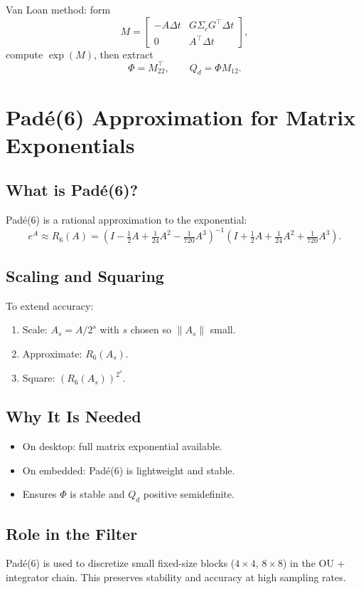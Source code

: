 \documentclass[11pt]{article}
\begin{document}
Van Loan method: form
\[
M = \begin{bmatrix}
- A\Delta t & G \Sigma_c G^\top \Delta t \\
0 & A^\top \Delta t
\end{bmatrix}, 
\]
compute $\exp(M)$, then extract
\[
\Phi = M_{22}^\top, \qquad Q_d = \Phi M_{12}.
\]

\section{Padé(6) Approximation for Matrix Exponentials}

\subsection{What is Padé(6)?}
Padé(6) is a rational approximation to the exponential:
\[
e^A \approx R_{6}(A) = \left(I - \tfrac{1}{2}A + \tfrac{1}{24}A^2 - \tfrac{1}{720}A^3\right)^{-1}
\left(I + \tfrac{1}{2}A + \tfrac{1}{24}A^2 + \tfrac{1}{720}A^3\right).
\]

\subsection{Scaling and Squaring}
To extend accuracy:
\begin{enumerate}
\item Scale: $A_s = A/2^s$ with $s$ chosen so $\|A_s\|$ small.
\item Approximate: $R_6(A_s)$.
\item Square: $(R_6(A_s))^{2^s}$.
\end{enumerate}

\subsection{Why It Is Needed}
\begin{itemize}
\item On desktop: full matrix exponential available.
\item On embedded: Padé(6) is lightweight and stable.
\item Ensures $\Phi$ is stable and $Q_d$ positive semidefinite.
\end{itemize}

\subsection{Role in the Filter}
Padé(6) is used to discretize small fixed-size blocks ($4\times 4$, $8\times 8$)
in the OU + integrator chain. This preserves stability and accuracy 
at high sampling rates.
\end{document}
